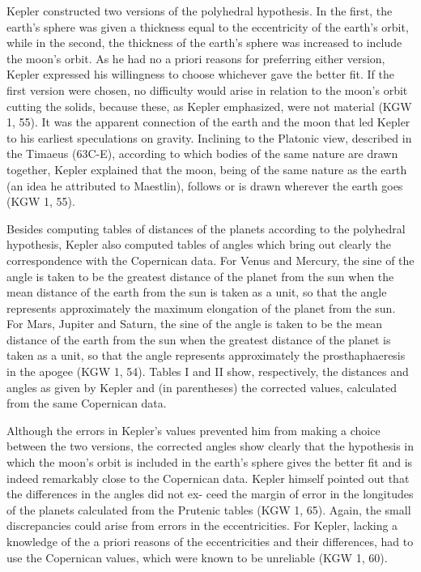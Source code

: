 \documentclass{article}
\begin{document}
Kepler constructed two versions of the polyhedral hypothesis. In the
first, the earth’s sphere was given a thickness equal to the eccentricity of
the earth’s orbit, while in the second, the thickness of the earth’s sphere
was increased to include the moon’s orbit. As he had no a priori reasons
for preferring either version, Kepler expressed his willingness to choose
whichever gave the better fit. If the first version were chosen, no difficulty
would arise in relation to the moon’s orbit cutting the solids, because
these, as Kepler emphasized, were not material (KGW 1, 55). It was the
apparent connection of the earth and the moon that led Kepler to his
earliest speculations on gravity. Inclining to the Platonic view, described
in the Timaeus (63C-E), according to which bodies of the same nature are
drawn together, Kepler explained that the moon, being of the same nature
as the earth (an idea he attributed to Maestlin), follows or is drawn
wherever the earth goes (KGW 1, 55).

Besides computing tables of distances of the planets according to the
polyhedral hypothesis, Kepler also computed tables of angles which bring
out clearly the correspondence with the Copernican data. For Venus and
Mercury, the sine of the angle is taken to be the greatest distance of the
planet from the sun when the mean distance of the earth from the sun is
taken as a unit, so that the angle represents approximately the maximum
elongation of the planet from the sun. For Mars, Jupiter and Saturn, the
sine of the angle is taken to be the mean distance of the earth from the sun
when the greatest distance of the planet is taken as a unit, so that the angle
represents approximately the prosthaphaeresis in the apogee (KGW 1,
54). Tables I and II show, respectively, the distances and angles as given
by Kepler and (in parentheses) the corrected values, calculated from the
same Copernican data.

Although the errors in Kepler’s values prevented him from making a
choice between the two versions, the corrected angles show clearly that the
hypothesis in which the moon’s orbit is included in the earth’s sphere
gives the better fit and is indeed remarkably close to the Copernican data.
Kepler himself pointed out that the differences in the angles did not ex-
ceed the margin of error in the longitudes of the planets calculated from
the Prutenic tables (KGW 1, 65). Again, the small discrepancies could
arise from errors in the eccentricities. For Kepler, lacking a knowledge of
the a priori reasons of the eccentricities and their differences, had to use
the Copernican values, which were known to be unreliable (KGW 1, 60).
\end{document}
